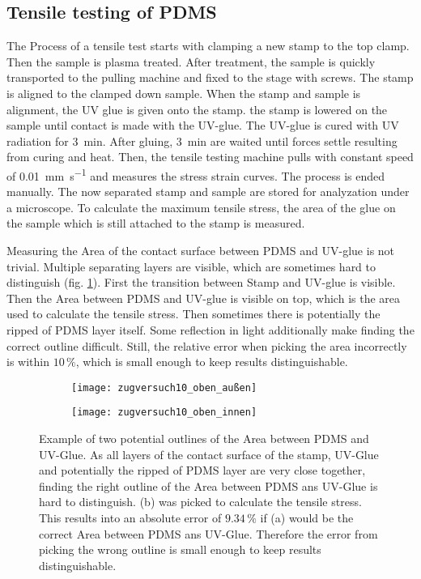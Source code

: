 \subsection{Tensile testing of PDMS}

The Process of a tensile test starts with clamping a new stamp to the top clamp. Then the sample is plasma treated. After treatment, the sample is quickly transported to the pulling machine and fixed to the stage with screws. The stamp is aligned to the clamped down sample. When the stamp and sample is alignment, the UV glue is given onto the stamp. the stamp is lowered on the sample until contact is made with the UV-glue. The UV-glue is cured with UV radiation for \SI{3}{\minute}. After gluing, \SI{3}{\minute} are waited until forces settle resulting from curing and heat. Then, the tensile testing machine pulls with constant speed of \SI{0,01}{\milli\meter\per\second} and measures the stress strain curves. The process is ended manually. The now separated stamp and sample are stored for analyzation under a microscope. To calculate the maximum tensile stress, the area of the glue on the sample which is still attached to the stamp is measured.

Measuring the Area of the contact surface between PDMS and UV-glue is not trivial. Multiple separating layers are visible, which are sometimes hard to distinguish (fig. \ref{fig:AreaStamp}). First the transition between Stamp and UV-glue is visible. Then the Area between PDMS and UV-glue is visible on top, which is the area used to calculate the tensile stress. Then sometimes there is potentially the ripped of PDMS layer itself. Some reflection in light additionally make finding the correct outline difficult. Still, the relative error when picking the area incorrectly is within $10\,\%$, which is small enough to keep results distinguishable.

\begin{figure}[hbt!]
	\centering
	\begin{subfigure}[]{0.45\textwidth}
		\centering
		\texttt{[image: zugversuch10\_oben\_außen]}
		\caption{}
	\end{subfigure}
	\begin{subfigure}[]{0.45\textwidth}
		\centering
		\texttt{[image: zugversuch10\_oben\_innen]}
		\caption{}
	\end{subfigure}
	\caption{Example of two potential outlines of the Area between PDMS and UV-Glue. As all layers of the contact surface of the stamp, UV-Glue and potentially the ripped of PDMS layer are very close together, finding the right outline of the Area between PDMS ans UV-Glue is hard to distinguish. (b) was picked to calculate the tensile stress. This results into an absolute error of $9.34\,\%$ if (a) would be the correct Area between PDMS ans UV-Glue. Therefore the error from picking the wrong outline is small enough to keep results distinguishable.}
	\label{fig:AreaStamp}
\end{figure}

